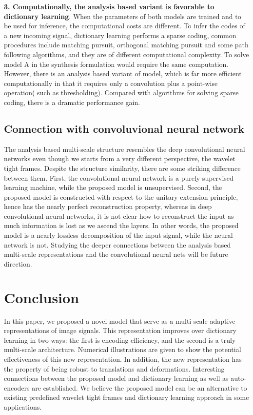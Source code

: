 \documentclass[a4paper]{article}
\begin{document}
\textbf{3. Computationally, the analysis based variant is favorable to dictionary learning}. When the parameters of both models are trained and to be used for inference, the computational costs are different. To infer the codes of a new incoming signal, dictionary learning performs a sparse coding, common procedures include matching pursuit, orthogonal matching pursuit and some path following algorithms, and they are of  different computational complexity. To solve model A in the synthesis formulation would require the same computation. However, there is an analysis based variant of model, which is far more efficient computationally in that it requires only a convolution plus a point-wise operation( such as thresholding). Compared with algorithms for solving sparse coding, there is a dramatic performance gain.

\subsection{Connection with convoluvional neural network}
The analysis based multi-scale structure resembles the deep convolutional neural networks even though we starts from a very different perspective, the wavelet tight frames. Despite the structure similarity, there are some striking difference between them. First, the convolutional neural network is a purely supervised learning machine, while the proposed model is unsupervised. Second, the proposed model is constructed with respect to the unitary extension principle, hence has the nearly perfect reconstruction property, whereas in deep convolutional neural networks, it is not clear how to reconstruct the input as much information is lost as we ascend the layers. In other words, the proposed model is a nearly lossless decomposition of the input signal, while the neural network is not.
Studying the deeper connections between the analysis based multi-scale representations and the convolutional neural nets will be future direction.

\section{Conclusion}
In this paper, we proposed a novel model that serve as a multi-scale adaptive representations of image signals. This representation improves over dictionary learning in two ways: the first is encoding efficiency, and the second is a truly multi-scale architecture. Numerical illustrations are given to show the potential effectiveness of this new representation. In addition, the new representation has the property of being robust to translations and deformations. Interesting connections between the proposed model and dictionary learning as well as auto-encoders are established. We believe the proposed model can be an alternative to existing predefined wavelet tight frames and dictionary learning approach in some applications.
\end{document}
